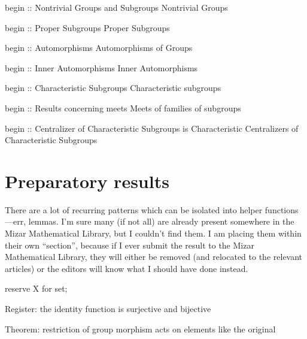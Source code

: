 begin :: Nontrivial Groups and Subgroups
\LA{}Nontrivial Groups~{\nwtagstyle{}}\RA{}

begin :: Proper Subgroups
\LA{}Proper Subgroups~{\nwtagstyle{}}\RA{}

begin :: Automorphisms
\LA{}Automorphisms of Groups~{\nwtagstyle{}}\RA{}

begin :: Inner Automorphisms
\LA{}Inner Automorphisms~{\nwtagstyle{}}\RA{}

begin :: Characteristic Subgroups
\LA{}Characteristic subgroups~{\nwtagstyle{}}\RA{}

begin :: Results concerning meets
\LA{}Meets of families of subgroups~{\nwtagstyle{}}\RA{}

begin :: Centralizer of Characteristic Subgroups is Characteristic
\LA{}Centralizers of Characteristic Subgroups~{\nwtagstyle{}}\RA{}

\nwendcode{}\nwdocspar

\section{Preparatory results}
There are a lot of recurring patterns which can be isolated into helper
functions---err, lemmas. I'm sure many (if not all) are already present
somewhere in the Mizar Mathematical Library, but I couldn't find them. I
am placing them within their own ``section'', because if I ever submit
the result to the Mizar Mathematical Library, they will either be
removed (and relocated to the relevant articles) or the editors will
know what I should have done instead.

\nwenddocs{}\endmoddef\nwstartdeflinemarkup{}\nwenddeflinemarkup
reserve X for set;

\LA{}Register: the identity function is surjective and bijective~{\nwtagstyle{}}\RA{}

\LA{}Theorem: restriction of group morphism acts on elements like the original~{\nwtagstyle{}}\RA{}

